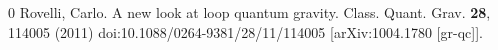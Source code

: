 \documentclass[aps,nofootinbib,amsfonts,superscriptaddress]{revtex4}
\begin{document}
\begin{thebibliography}{0}
Rovelli, Carlo. A new look at loop quantum gravity.
Class. Quant. Grav. \textbf{28}, 114005 (2011)
doi:10.1088/0264-9381/28/11/114005
[arXiv:1004.1780 [gr-qc]].













\end{thebibliography}		
\end{document}
